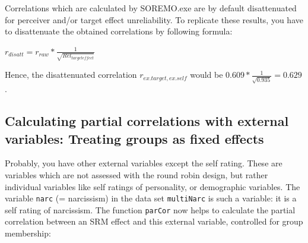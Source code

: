 \documentclass[a4paper]{article}\usepackage[]{graphicx}\usepackage[]{color}
\begin{document}
Correlations which are calculated by SOREMO.exe are by default disattenuated for perceiver and/or target effect unreliability. To replicate these results, you have to disattenuate the obtained correlations by following formula:

$r_{disatt} = r_{raw}*\frac{1}{\sqrt{Rel_{target effect}}}$

Hence, the disattenuated correlation $r_{ex.target,ex.self}$ would be $0.609*\frac{1}{\sqrt{0.935}} = 0.629$.






\subsection{Calculating partial correlations with external variables: Treating groups as fixed effects} %
\label{subsec:part}

Probably, you have other external variables except the self rating. These are variables which are not assessed with the round robin design, but rather individual variables like self ratings of personality, or demographic variables. The variable \texttt{narc} (= narcissism) in the data set \texttt{multiNarc} is such a variable: it is a self rating of narcissism. The function \texttt{parCor} now helps to calculate the partial correlation between an SRM effect and this external variable, controlled for group membership:
\end{document}
